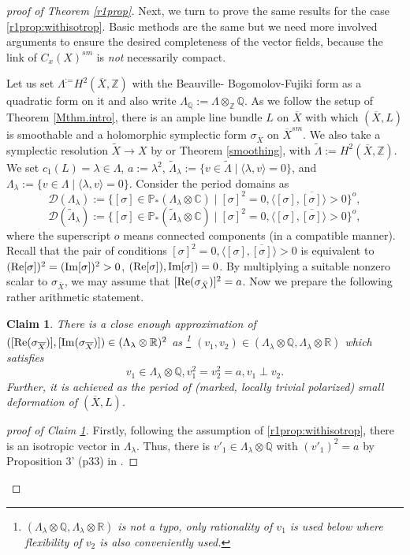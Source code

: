 \documentclass[12pt,a4paper]{amsart}
\newtheorem{Claim}[Thm]{Claim}
\theoremstyle{remark}
\theoremstyle{definition}
\def\R{\mathbb{R}}
\def\C{\mathbb{C}}
\def\Z{\mathbb{Z}}
\def\Q{\mathbb{Q}}
\begin{document}
\begin{proof}[proof of Theorem \ref{r1prop}]

\vspace{2mm}

Next, we turn to prove the same results 
for the case \eqref{r1prop:withisotrop}. Basic methods are the same but 
we need more involved arguments to ensure the desired completeness of the 
vector fields, because the link of $C_x(X)^{sm}$ 
is {\it not} necessarily compact. 

Let us set 
$\Lambda^:=H^2(\overline{X},\Z)$ with the Beauville-
Bogomolov-Fujiki 
form as a quadratic form on it and also write 
$\Lambda_{\Q}:=\Lambda\otimes_{\Z}\Q$. 
As we follow the 
setup of Theorem \ref{Mthm.intro}, there is an ample line bundle 
$L$ on $\overline{X}$ with which $(\overline{X},L)$ is smoothable and a holomorphic symplectic form $\sigma_{\overline{X}}$ 
on $\overline{X}^{sm}$. We also take a symplectic resolution 
$\tilde{X}\to X$ 
by \cite[Theorem 4.8]{Fujiki} or Theorem 
\ref{smoothing}, 
with $\tilde{\Lambda}:=H^2(\overline{X},\Z)$. 
We set $c_1(L)=\lambda\in \Lambda$, $a:=\lambda^2$,  
$\tilde{\Lambda}_\lambda:=\{v\in \tilde{\Lambda}\mid 
\langle \lambda, v\rangle=0\}$, and 
$\Lambda_\lambda:=\{v\in \Lambda \mid 
\langle \lambda, v\rangle=0\}$. 
Consider the period domains as 
\[\mathcal{D}(\Lambda_\lambda):=\{[\sigma]\in 
\mathbb{P}_*(\Lambda_\lambda\otimes \C)\mid [\sigma]^2=0, 
\langle[\sigma],\overline{[\sigma]}\rangle>0 \}^o,\]
\[\mathcal{D}(\tilde{\Lambda}_\lambda):=\{[\sigma]\in 
\mathbb{P}_*(\tilde{\Lambda}_\lambda\otimes \C)\mid [\sigma]^2=0, 
\langle[\sigma],\overline{[\sigma]}\rangle>0 \}^o,\]
where the superscript 
$o$ means connected components (in a compatible manner). 
Recall that the pair of conditions 
$[\sigma]^2=0, 
\langle[\sigma],\overline{[\sigma]}\rangle>0$ is 
equivalent to 
$({\rm Re}[\sigma])^2=({\rm Im}[\sigma])^2>0$, 
$({\rm Re}[\sigma]), {\rm Im}[\sigma]) = 0$. 
By multiplying a suitable nonzero scalar to $\sigma_{\bar X}$, we may assume that $[{\rm Re}(\sigma_{\bar X})]^2 = a$.
Now we prepare the following rather arithmetic statement. 
\begin{Claim}\label{claim:approxperiod}
There is 
a close enough 
approximation of 
$([{\rm Re}(\sigma_{\overline{X}})],[{\rm Im}(\sigma_{\overline{X}})])
\in (\Lambda_\lambda\otimes \R)^2$ 
as 
\footnote{$(\Lambda_\lambda\otimes 
\Q,\Lambda_\lambda\otimes \R)$ is not a 
typo, 
only rationality of $v_1$ is used below  
where 
flexibility of $v_2$ is also conveniently 
used.} 
$(v_1,v_2)\in 
(\Lambda_\lambda\otimes \Q,\Lambda_\lambda\otimes \R)$ 
which satisfies 
\[v_1\in \Lambda_\lambda\otimes \Q, 
v_1^2=v_2^2=a, v_1\perp v_2.\]
Further, it is achieved as the period of 
(marked, locally trivial polarized) small deformation of $(\overline{X},L)$. 
\end{Claim}
\begin{proof}[proof of Claim \ref{claim:approxperiod}]
Firstly, following the assumption of \eqref{r1prop:withisotrop}, 
there is an isotropic vector in $\Lambda_\lambda$. 
Thus, there is 
$v'_1\in \Lambda_\lambda\otimes \Q$ 
with $(v'_1)^2=a$ by 
Proposition 3' (p33) in \cite{Serre.arith}. 


\end{proof}
\end{proof}
\end{document}
